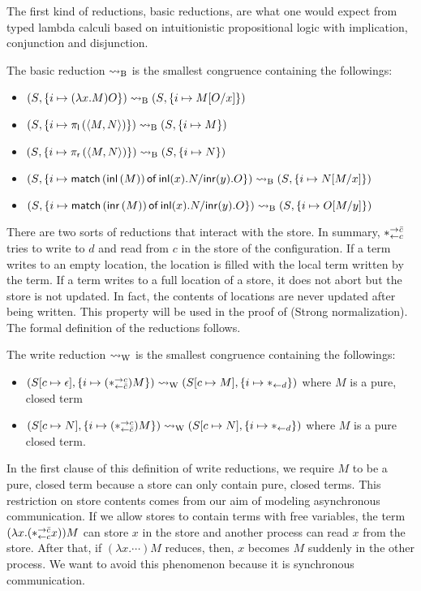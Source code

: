The first kind of reductions, basic reductions, are what one would
expect from typed lambda calculi based on intuitionistic propositional
logic with implication, conjunction and disjunction.
\begin{definition}
 The basic reduction $\rightsquigarrow_{\mathrm B}$ is the smallest congruence containing
 the followings:
 \begin{itemize}
  \item  $({S}{},{\{i\mapsto {(\lambda x.M)O}\}})\rightsquigarrow_{\mathrm B}
	 ({S}{},{\{i\mapsto {M[O/x]}\}})$
  \item $({S}{},{\{i\mapsto {\pi_{\mathsf l}\left({\langle{M,N}\rangle}\right)}\}}) \rightsquigarrow_{\mathrm B}
	 ({S}{},{           \{i\mapsto {M}\}   })$
  \item $({S}{},{\{i\mapsto {\pi_{\mathsf r}\left({\langle{M,N}\rangle}\right)}\}}) \rightsquigarrow_{\mathrm B}
	 ({S}{},{             \{i\mapsto {N}\} })$
  \item $({S}{},{\{i\mapsto {\mathsf{match}\,{(\mathsf{inl}\left({M}\right))}\,\mathsf{of}\, \mathsf{inl}({x}). {N}/ \mathsf{inr}({y}). {O}}\}}) \rightsquigarrow_{\mathrm B}
	 ({S}{},{              \{i\mapsto {N[M/x]}\}})$
  \item $({S}{},{\{i\mapsto {\mathsf{match}\,{(\mathsf{inr}\left({M}\right))}\,\mathsf{of}\, \mathsf{inl}({x}). {N}/ \mathsf{inr}({y}). {O}}\}}) \rightsquigarrow_{\mathrm B}
	 ({S}{},{                  \{i\mapsto {O[M/y]}\}})$
 \end{itemize}
\end{definition}

There are two sorts of reductions that interact with the store.
In summary, $\ast^{\rightarrow {\bar{c}}}_{\leftarrow{c}}$ tries to write to $d$ and read from
$c$ in the store of the configuration.
If a term writes to an empty location, the location is filled with the
local term written by the term.
 If a term writes to a full location of
a store, it does not abort but the store is not updated.  In fact, the
contents of locations are never updated after being written.
This property will be used in the proof of  (Strong normalization).
The formal definition of the reductions follows.
\begin{definition}
 The write reduction $\rightsquigarrow_{\mathrm W}$ is the smallest congruence
 containing the followings:
 \begin{itemize}
  \item $({S}{[c\mapsto \epsilon]},{\{i\mapsto {(\ast^{\rightarrow {c}}_{\leftarrow{\bar{c}}})M}\}}) \rightsquigarrow_{\mathrm W}
	({S}{[c\mapsto M]},{\{i\mapsto {\ast_{\leftarrow{d}}}\}})
	$ where $M$ is a pure, closed term
  \item $({S}{[c\mapsto N]},{\{i\mapsto {(\ast^{\rightarrow {c}}_{\leftarrow{\bar{c}}}) M}\}}) \rightsquigarrow_{\mathrm W}
	({S}{[c\mapsto	N]},{\{i\mapsto {\ast_{\leftarrow{d}}}\}})$ where $M$ is a pure
	closed term.
 \end{itemize}
\end{definition}
In the first clause of this definition of write reductions, we require
$M$ to be a pure, closed
term because a store can only contain pure, closed terms.
This restriction on store contents comes from our aim of modeling
asynchronous communication.
If we allow stores to contain terms with free variables,
the term $(\lambda x. (\ast^{\rightarrow {\bar{c}}}_{\leftarrow{c}} x)) M$ can store $x$ in the store and
another process can read $x$ from the store.
After that, if $(\lambda x.\cdots)M$ reduces,
then, $x$ becomes $M$ suddenly in the other process.
We want to avoid this phenomenon because it is synchronous communication.

